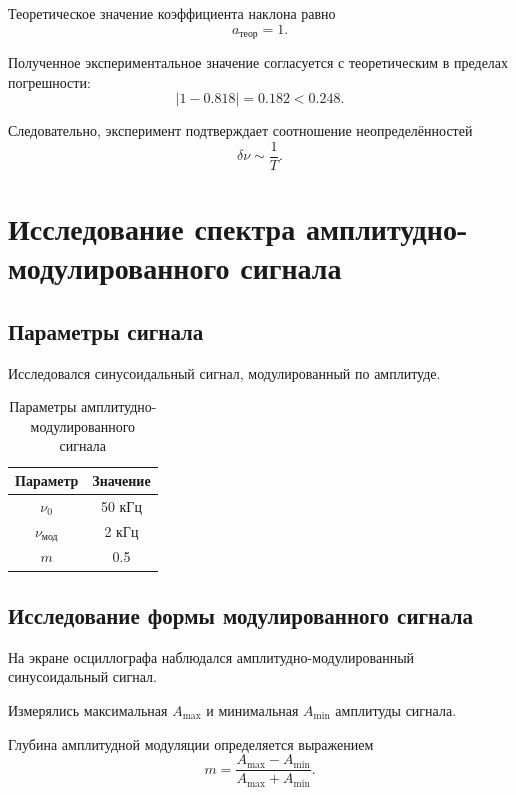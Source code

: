 \documentclass[14pt,a4paper]{extarticle}
\begin{document}
Теоретическое значение коэффициента наклона равно
\[
a_{\text{теор}}=1.
\]

Полученное экспериментальное значение согласуется с теоретическим
в пределах погрешности:
\[
|1-0{.}818|=0{.}182<0{.}248.
\]

Следовательно, эксперимент подтверждает соотношение
неопределённостей
\[
\boxed{\delta\nu\sim\frac{1}{T}}.
\]


\section{Исследование спектра амплитудно-модулированного сигнала}

\subsection{Параметры сигнала}

Исследовался синусоидальный сигнал, модулированный по амплитуде.


\begin{table}[H]
\centering
\caption{Параметры амплитудно-модулированного сигнала}
\begin{tabular}{|c|c|}
\hline
Параметр & Значение \\
\hline
$\nu_0$ & 50 кГц\\
\hline
$\nu_{\text{мод}}$ & 2 кГц\\
\hline
$m$ & 0.5\\
\hline
\end{tabular}
\end{table}

\subsection{Исследование формы модулированного сигнала}

На экране осциллографа наблюдался амплитудно-модулированный
синусоидальный сигнал.

Измерялись максимальная $A_{\max}$ и минимальная $A_{\min}$
амплитуды сигнала.

Глубина амплитудной модуляции определяется выражением
\begin{equation}
m=
\frac{A_{\max}-A_{\min}}
     {A_{\max}+A_{\min}}.
\end{equation}
\end{document}
